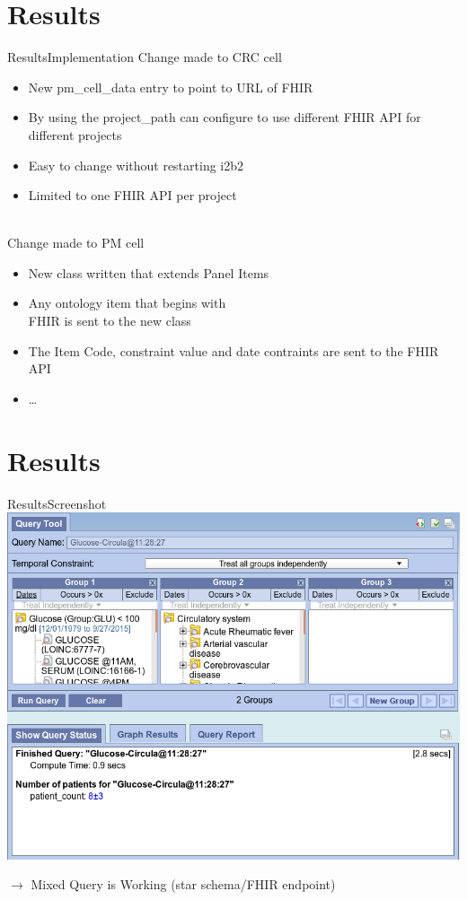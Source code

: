 \documentclass[10pt]{beamer}
\begin{document}
\section{Results}
\begin{frame}{Results}{Implementation}
	Change made to CRC cell
\begin{itemize}
\item New pm\_cell\_data entry to point to URL of FHIR
\item By using the project\_path can configure to use  different FHIR API for different projects
\item Easy to change without restarting i2b2
\item Limited to one FHIR API per project
\end{itemize}
~
\\
	Change made to PM cell
\begin{itemize}
\item New class written that extends Panel Items
\item Any ontology item that begins with \\FHIR is sent to the new class
\item The Item Code, constraint value and date contraints are sent to the FHIR API
\item \ldots
\end{itemize}
\end{frame}

\section{Results}
\begin{frame}{Results}{Screenshot}
\includegraphics[height=.7\textheight]{images/demo.png}

	$\rightarrow$ Mixed Query is Working (star schema/FHIR endpoint)
\end{frame}
\end{document}
